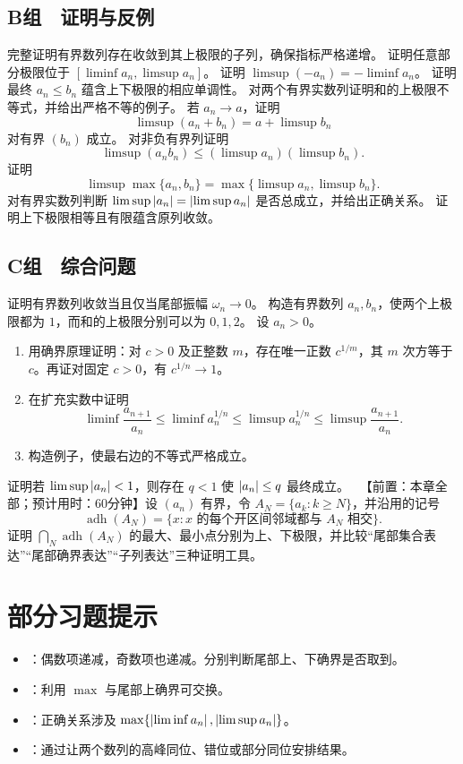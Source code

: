 \subsection*{B组　证明与反例}
\begin{enumerate}[label=\textbf{\thechapter.\arabic*.},resume]
  完整证明有界数列存在收敛到其上极限的子列，确保指标严格递增。
  证明任意部分极限位于 \([\liminf a_n,\limsup a_n]\)。
  证明 \(\limsup(-a_n)=-\liminf a_n\)。
  证明最终 \(a_n\le b_n\) 蕴含上下极限的相应单调性。
  对两个有界实数列证明和的上极限不等式，并给出严格不等的例子。
  若 \(a_n\to a\)，证明
 \[
 \limsup(a_n+b_n)=a+\limsup b_n
 \]
 对有界 \((b_n)\) 成立。
  对非负有界列证明
 \[
 \limsup(a_nb_n)\le(\limsup a_n)(\limsup b_n).
 \]
  证明
 \[
 \limsup\max\{a_n,b_n\}
 =\max\{\limsup a_n,\limsup b_n\}.
 \]
  对有界实数列判断 \(\limsup\left|a_n\right|=\left|\limsup a_n\right|\) 是否总成立，并给出正确关系。
  证明上下极限相等且有限蕴含原列收敛。
\end{enumerate}

\subsection*{C组　综合问题}
\begin{enumerate}[label=\textbf{\thechapter.\arabic*.},resume]
  证明有界数列收敛当且仅当尾部振幅 \(\omega_n\to0\)。
  构造有界数列 \(a_n,b_n\)，使两个上极限都为 \(1\)，而和的上极限分别可以为 \(0,1,2\)。
  设 \(a_n>0\)。
 \begin{enumerate}[label=(\arabic*)]
  \item 用确界原理证明：对 \(c>0\) 及正整数 \(m\)，存在唯一正数 \(c^{1/m}\)，其 \(m\) 次方等于 \(c\)。再证对固定 \(c>0\)，有 \(c^{1/n}\to1\)。
  \item 在扩充实数中证明
  \[
   \liminf\frac{a_{n+1}}{a_n}\le\liminf a_n^{1/n}
   \le\limsup a_n^{1/n}\le\limsup\frac{a_{n+1}}{a_n}.
  \]
  \item 构造例子，使最右边的不等式严格成立。
 \end{enumerate}
  证明若 \(\limsup\left|a_n\right|<1\)，则存在 \(q<1\) 使 \(\left|a_n\right|\le q\) 最终成立。
  \ 【前置：本章全部；预计用时：60分钟】设 \((a_n)\) 有界，令 \(A_N=\{a_k:k\ge N\}\)，并沿用的记号
 \[
  \operatorname{adh}(A_N)=\{x:\text{\(x\) 的每个开区间邻域都与 \(A_N\) 相交}\}.
 \]
 证明 \(\bigcap_N\operatorname{adh}(A_N)\) 的最大、最小点分别为上、下极限，并比较“尾部集合表达”“尾部确界表达”“子列表达”三种证明工具。
\end{enumerate}

\section*{部分习题提示}
\begin{itemize}
 \item {}：偶数项递减，奇数项也递减。分别判断尾部上、下确界是否取到。
 \item {}：利用 \(\max\) 与尾部上确界可交换。
 \item {}：正确关系涉及 \(\max\{\left|\liminf a_n\right|,\left|\limsup a_n\right|\}\)。
 \item {}：通过让两个数列的高峰同位、错位或部分同位安排结果。
\end{itemize}
